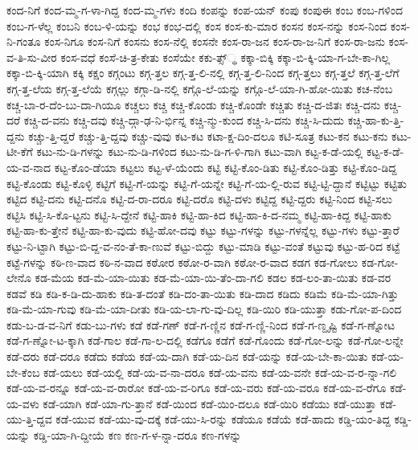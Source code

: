 {ಕಂದ-ನಿಗೆ
ಕಂದ-ಮ್ಮ-ಗ-ಳಾ-ಗಿದ್ದ
ಕಂದ-ಮ್ಮ-ಗಳು
ಕಂದಿ
ಕಂಪನ್ನು
ಕಂಪ-ಯನ್
ಕಂಪು
ಕಂಪುಈ
ಕಂಬ
ಕಂಬ-ಗಳಿಂದ
ಕಂಬ-ಗ-ಳೆಲ್ಲ
ಕಂಬನಿ
ಕಂಬ-ಳಿ-ಯನ್ನು
ಕಂಭ
ಕಂಭ-ದಲ್ಲಿ
ಕಂಸ
ಕಂಸ-ಕು-ಮಾರ
ಕಂಸನ
ಕಂಸ-ನನ್ನು
ಕಂಸ-ನಿಂದ
ಕಂಸ-ನಿ-ಗಂತೂ
ಕಂಸ-ನಿಗೂ
ಕಂಸ-ನಿಗೆ
ಕಂಸನು
ಕಂಸ-ನೆಲ್ಲಿ
ಕಂಸನೇ
ಕಂಸ-ರಾ-ಜನ
ಕಂಸ-ರಾ-ಜ-ನಿಗೆ
ಕಂಸ-ರಾ-ಜನು
ಕಂಸ-ವ-ತಿ-ಸು-ವೀರ
ಕಂಸ-ವಧೆ
ಕಂಸೆ-ಚಿ-ತ್ರ-ಕೇತು
ಕಂಸೆಯೇ
ಕಕು-ತ್ಸ್್ಥ
ಕಕ್ಕಾ-ಬಿಕ್ಕಿ
ಕಕ್ಕಾ-ಬಿ-ಕ್ಕಿ-ಯಾ-ಗ-ಬೇ-ಕಾ-ಗಿಲ್ಲ
ಕಕ್ಕಾ-ಬಿ-ಕ್ಕಿ-ಯಾಗಿ
ಕಕ್ಕಿ
ಕಕ್ಷಂ
ಕಗ್ಗಂಟು
ಕಗ್ಗ-ತ್ತಲ
ಕಗ್ಗ-ತ್ತ-ಲಿ-ನಲ್ಲಿ
ಕಗ್ಗ-ತ್ತ-ಲಿ-ನಿಂದ
ಕಗ್ಗ-ತ್ತಲು
ಕಗ್ಗ-ತ್ತಲೆ
ಕಗ್ಗ-ತ್ತ-ಲೆಗೆ
ಕಗ್ಗ-ತ್ತ-ಲೆಯ
ಕಗ್ಗ-ತ್ತ-ಲೆಯೆ
ಕಗ್ಗಲ್ಲು
ಕಗ್ಗಾ-ಡಿ-ನಲ್ಲಿ
ಕಗ್ಗೊ-ಲೆ-ಯನ್ನು
ಕಗ್ಗೊ-ಲೆ-ಯಾ-ಗಿ-ಹೋ-ಯಿತು
ಕಚ-ನೆಂಬ
ಕಚ್ಚ-ಬಾ-ರ-ದೆಂ-ಬು-ದಾ-ಗಿಯೂ
ಕಚ್ಚಲು
ಕಚ್ಚಿ
ಕಚ್ಚಿ-ಕೊಂಡು
ಕಚ್ಚಿ-ಕೊಂಡೇ
ಕಚ್ಚಿತು
ಕಚ್ಚಿ-ದ-ಜಿತಃ
ಕಚ್ಚಿ-ದನು
ಕಚ್ಚಿ-ದರೆ
ಕಚ್ಚಿ-ದ-ವನು
ಕಚ್ಚಿ-ದವು
ಕಚ್ಚಿ-ದ್ಗಾ-ಢ-ನಿ-ರ್ಭಿನ್ನ
ಕಚ್ಚಿ-ನ್ಮು-ಕುಂದ
ಕಚ್ಚಿ-ಸಿ-ದನು
ಕಚ್ಚಿ-ಸಿ-ದುದು
ಕಚ್ಚಿ-ಹಾ-ಕು-ತ್ತಿ-ದ್ದನು
ಕಚ್ಚು-ತ್ತಿ-ದ್ದರೆ
ಕಚ್ಚು-ತ್ತಿ-ದ್ದವು
ಕಚ್ಚು-ವುವು
ಕಟ-ಕಟ
ಕಟಾ-ಕ್ಷ-ದಿಂ-ದಲೂ
ಕಟಿ-ಸೂತ್ರ
ಕಟು-ಕನ
ಕಟು-ಕನು
ಕಟು-ಟೀ-ಕೆಗೆ
ಕಟು-ನು-ಡಿ-ಗಳನ್ನು
ಕಟು-ನು-ಡಿ-ಗಳಿಂದ
ಕಟು-ನು-ಡಿ-ಗ-ಳಿ-ಗಾಗಿ
ಕಟು-ವಾಗಿ
ಕಟ್ಟ-ಕ-ಡೆ-ಯಲ್ಲಿ
ಕಟ್ಟ-ಕ-ಡೆ-ಯ-ವ-ನಾದ
ಕಟ್ಟ-ಕೊಂ-ಡೆಯಾ
ಕಟ್ಟಲು
ಕಟ್ಟ-ಳೆ-ಯೆಂದು
ಕಟ್ಟಿ
ಕಟ್ಟಿ-ಕೊಂ-ಡಿತು
ಕಟ್ಟಿ-ಕೊಂ-ಡಿತ್ತು
ಕಟ್ಟಿ-ಕೊಂ-ಡಿದ್ದ
ಕಟ್ಟಿ-ಕೊಂಡು
ಕಟ್ಟಿ-ಕೊಳ್ಳಿ
ಕಟ್ಟಿಗೆ
ಕಟ್ಟಿ-ಗೆ-ಯನ್ನು
ಕಟ್ಟಿ-ಗೆ-ಯನ್ನೇ
ಕಟ್ಟಿ-ಗೆ-ಯ-ಲ್ಲಿ-ರುವ
ಕಟ್ಟಿ-ಟ್ಟಿ-ದ್ದಾನೆ
ಕಟ್ಟಿಟ್ಟು
ಕಟ್ಟಿತು
ಕಟ್ಟಿದ
ಕಟ್ಟಿ-ದನು
ಕಟ್ಟಿ-ದನೊ
ಕಟ್ಟಿ-ದ-ರಾ-ದರೂ
ಕಟ್ಟಿ-ದರೊ
ಕಟ್ಟಿ-ದಳು
ಕಟ್ಟಿದ್ದ
ಕಟ್ಟಿ-ದ್ದರು
ಕಟ್ಟಿ-ನಿಂದ
ಕಟ್ಟಿ-ಸಲು
ಕಟ್ಟಿಸಿ
ಕಟ್ಟಿ-ಸಿ-ಕೊ-ಟ್ಟನು
ಕಟ್ಟಿ-ಸಿ-ದ್ದೇನೆ
ಕಟ್ಟಿ-ಹಾಕಿ
ಕಟ್ಟಿ-ಹಾ-ಕಿದ
ಕಟ್ಟಿ-ಹಾ-ಕಿ-ದ-ನಮ್ಮ
ಕಟ್ಟಿ-ಹಾ-ಕಿದ್ದ
ಕಟ್ಟಿ-ಹಾಕು
ಕಟ್ಟಿ-ಹಾ-ಕು-ತ್ತೇನೆ
ಕಟ್ಟಿ-ಹಾ-ಕು-ವುದು
ಕಟ್ಟಿ-ಹೋ-ದವು
ಕಟ್ಟು
ಕಟ್ಟು-ಗಳನ್ನು
ಕಟ್ಟು-ಗಳನ್ನೆಲ್ಲ
ಕಟ್ಟು-ಗಳು
ಕಟ್ಟು-ತ್ತಾರೆ
ಕಟ್ಟು-ನಿ-ಟ್ಟಾಗಿ
ಕಟ್ಟು-ಬಿ-ದ್ದ-ವ-ನಂ-ತೆ-ಕಾ-ಣುವೆ
ಕಟ್ಟು-ಬಿದ್ದು
ಕಟ್ಟು-ಮಾಡಿ
ಕಟ್ಟು-ವಂತೆ
ಕಟ್ಟುವು
ಕಟ್ಟು-ಹ-ರಿದ
ಕಟ್ಟೆ
ಕಟ್ಟೆ-ಗಳನ್ನು
ಕಠಿ-ಣ-ವಾದ
ಕಠಿ-ನ-ವಾದ
ಕಠೋರ
ಕಠೋ-ರ-ವಾಗಿ
ಕಠೋ-ರ-ವಾದ
ಕಡಗ
ಕಡ-ಗೋಲು
ಕಡ-ಗೋ-ಲೇನೊ
ಕಡ-ಮೆಯ
ಕಡ-ಮೆ-ಯಾ-ಯಿತು
ಕಡ-ಮೆ-ಯಾ-ಯಿ-ತೆಂ-ದಾ-ಗಲಿ
ಕಡಲ
ಕಡ-ಲಂ-ತಾ-ಯಿತು
ಕಡ-ವರ
ಕಡವೆ
ಕಡಿ
ಕಡಿ-ಕ-ಡಿ-ದು-ಹಾಕು
ಕಡಿ-ತ-ದಂತೆ
ಕಡಿ-ದಂ-ತಾ-ಯಿತು
ಕಡಿ-ದಾದ
ಕಡಿದು
ಕಡಿಮೆ
ಕಡಿ-ಮೆ-ಯಾ-ಗಿತ್ತು
ಕಡಿ-ಮೆ-ಯಾ-ಗುವು
ಕಡಿ-ಮೆ-ಯಾ-ದೀತು
ಕಡಿ-ಯ-ಲಾ-ಗು-ವು-ದಿಲ್ಲ
ಕಡಿ-ಯಿರಿ
ಕಡಿ-ಯುತ್ತಾ
ಕಡು-ಗೋ-ಪ-ದಿಂದ
ಕಡು-ಬ-ಡ-ವ-ನಿಗೆ
ಕಡು-ಬು-ಗಳು
ಕಡೆ
ಕಡೆ-ಗಣ್
ಕಡೆ-ಗ-ಣ್ಣಿನ
ಕಡೆ-ಗ-ಣ್ಣಿ-ನಿಂದ
ಕಡೆ-ಗ-ಣ್ದೃಷ್ಟಿ
ಕಡೆ-ಗ-ಣ್ನೋಟ
ಕಡೆ-ಗ-ಣ್ನೋ-ಟ-ಕ್ಕಾಗಿ
ಕಡೆ-ಗಾಲ
ಕಡೆ-ಗಾ-ಲ-ದಲ್ಲಿ
ಕಡೆಗೂ
ಕಡೆಗೆ
ಕಡೆ-ಗೊಂದು
ಕಡೆ-ಗೋ-ಲನ್ನು
ಕಡೆ-ಗೋ-ಲನ್ನೇ
ಕಡೆ-ದರು
ಕಡೆ-ದರೂ
ಕಡೆದು
ಕಡೆಯ
ಕಡೆ-ಯ-ದಾಗಿ
ಕಡೆ-ಯ-ದಿನ
ಕಡೆ-ಯನ್ನು
ಕಡೆ-ಯ-ಬೇ-ಕಾ-ಯಿತು
ಕಡೆ-ಯ-ಬೇ-ಕೆಂಬ
ಕಡೆ-ಯಲು
ಕಡೆ-ಯಲ್ಲಿ
ಕಡೆ-ಯ-ವ-ನಾ-ದರೂ
ಕಡೆ-ಯ-ವನು
ಕಡೆ-ಯ-ವನೇ
ಕಡೆ-ಯ-ವ-ರ-ನ್ನಾ-ಗಲಿ
ಕಡೆ-ಯ-ವ-ರನ್ನೂ
ಕಡೆ-ಯ-ವ-ರಾರೋ
ಕಡೆ-ಯ-ವ-ರಿಗೂ
ಕಡೆ-ಯ-ವರು
ಕಡೆ-ಯ-ವರೂ
ಕಡೆ-ಯ-ವ-ರೆಗೂ
ಕಡೆ-ಯ-ವಳು
ಕಡೆ-ಯಾಗಿ
ಕಡೆ-ಯಾ-ಗು-ತ್ತಾನೆ
ಕಡೆ-ಯಿಂದ
ಕಡೆ-ಯಿಂ-ದಲೂ
ಕಡೆ-ಯಿರಿ
ಕಡೆಯು
ಕಡೆ-ಯುತ್ತಾ
ಕಡೆ-ಯು-ತ್ತಿ-ದ್ದವ
ಕಡೆ-ಯುವ
ಕಡೆ-ಯು-ವು-ದಕ್ಕೆ
ಕಡೆ-ಯು-ಸಿ-ರನ್ನು
ಕಡೆಯೂ
ಕಡೆಯೆ
ಕಡೆ-ಹಾದು
ಕಡ್ಡಿ-ಯಂ-ತಿದ್ದ
ಕಡ್ಡಿ-ಯನ್ನು
ಕಡ್ಡಿ-ಯಾ-ಗಿ-ದ್ದೀಯೆ
ಕಣ
ಕಣ-ಗ-ಳ-ನ್ನಾ-ದರೂ
ಕಣ-ಗಳನ್ನು
}
